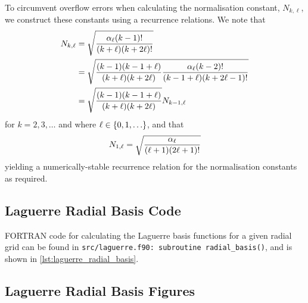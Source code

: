 \documentclass[]{article}
\begin{document}
To circumvent overflow errors when calculating the normalisation constant,
$N_{k, \ell}$, we construct these constants using a recurrence relations.
We note that
\begin{alignat*}{2}
  N_{k, \ell}
  {}={}
  &
  \sqrt
  {
    \dfrac
    {
      \alpha_{\ell}
      (k - 1)!
    }
    {
      (k + \ell)
      (k + 2\ell)!
    }
  }
  \\
  {}={}
  &
  \sqrt
  {
    \dfrac
    {
      (k - 1)
      (k - 1 + \ell)
    }
    {
      (k + \ell)
      (k + 2\ell)
    }
    \dfrac
    {
      \alpha_{\ell}
      (k - 2)!
    }
    {
      (k - 1 + \ell)
      (k + 2\ell - 1)!
    }
  }
  \\
  {}={}
  &
  \sqrt
  {
    \dfrac
    {
      (k - 1)
      (k - 1 + \ell)
    }
    {
      (k + \ell)
      (k + 2\ell)
    }
  }
  N_{k - 1, \ell}
\end{alignat*}
for $k = 2, 3, \dotsc$ and where $\ell \in \lrset{0, 1, \dotsc}$, and that
\begin{equation*}
  N_{1, \ell}
  =
  \sqrt
  {
    \dfrac
    {
      \alpha_{\ell}
    }
    {
      (\ell + 1)
      (2\ell + 1)!
    }
  }
\end{equation*}
yielding a numerically-stable recurrence relation for the normalisation
constants as required.

\subsection{Laguerre Radial Basis Code}
\label{sec:lagu-radi-basis-code}

FORTRAN code for calculating the Laguerre basis functions for a given radial
grid can be found in
\lstinline[style=ff]{src/laguerre.f90: }\lstinline{subroutine radial_basis()},
and is shown in \autoref{lst:laguerre_radial_basis}.




\subsection{Laguerre Radial Basis Figures}
\label{sec:lagu-radi-basis-figs}
\end{document}
